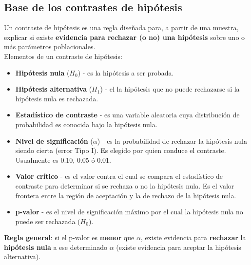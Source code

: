 \documentclass[10pt, a4paper, landscape]{extarticle}
\begin{document}
\begin{multicols}{3}
	\subsection*{Base de los contrastes de hipótesis}
		Un contraste de hipótesis es una regla diseñada para, a partir de una muestra, explicar si existe \textbf{evidencia para rechazar (o no) una hipótesis} sobre uno o más parámetros poblacionales. \\
		Elementos de un contraste de hipótesis:
		\begin{itemize}[leftmargin=*]
			\item \textbf{Hipótesis nula} ($H_0$) - es la hipótesis a ser probada.
			\item \textbf{Hipótesis alternativa} ($H_1$) - el la hipótesis que no puede rechazarse si la hipótesis nula es rechazada.
			\item \textbf{Estadístico de contraste} - es una variable aleatoria cuya distribución de probabilidad es conocida bajo la hipótesis nula.
			\item \textbf{Nivel de significación} ($\alpha$) - es la probabilidad de rechazar la hipótesis nula siendo cierta (error Tipo I). Es elegido por quien conduce el contraste. Usualmente es 0.10, 0.05 ó 0.01.
			\item \textbf{Valor crítico} - es el valor contra el cual se compara el estadístico de contraste para determinar si se rechaza o no la hipótesis nula. Es el valor frontera entre la región de aceptación y la de rechazo de la hipótesis nula.
			\item \textbf{p-valor} - es el nivel de significación máximo por el cual la hipótesis nula no puede ser rechazada ($H_0$).
		\end{itemize}
		\textbf{Regla general}: si el p-valor es \textbf{menor} que $\alpha$, existe evidencia para \textbf{rechazar} la \textbf{hipótesis nula} a ese determinado $\alpha$ (existe evidencia para aceptar la hipótesis alternativa).

\end{multicols}
\end{document}
